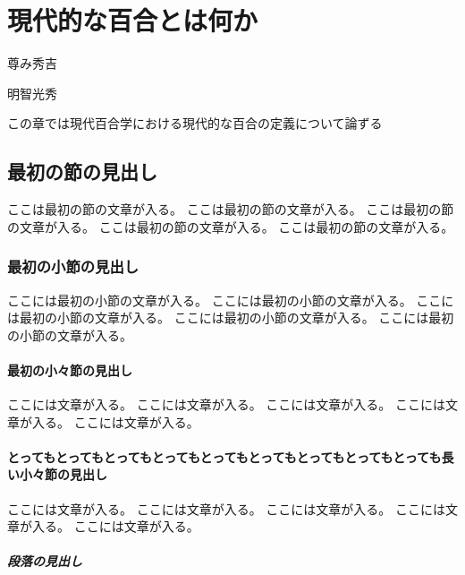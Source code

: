\documentclass[ %
	uplatex,%
	a5paper,%
	papersize%
	]{jsbook}
\begin{document}
						\tableofcontents %

						\mainmatter

						\chapter{現代的な百合とは何か}

						\epigraph{尊み秀吉}{明智光秀}

						\begin{summary}
							この章では現代百合学における現代的な百合の定義について論ずる
						\end{summary}

						\section{最初の節の見出し}

						ここは最初の節の文章が入る。
						ここは最初の節の文章が入る。
						ここは最初の節の文章が入る。
						ここは最初の節の文章が入る。
						ここは最初の節の文章が入る。

						\subsection{最初の小節の見出し}

						ここには最初の小節の文章が入る。
						ここには最初の小節の文章が入る。
						ここには最初の小節の文章が入る。
						ここには最初の小節の文章が入る。
						ここには最初の小節の文章が入る。

						\subsubsection{最初の小々節の見出し}

						ここには文章が入る。
						ここには文章が入る。
						ここには文章が入る。
						ここには文章が入る。
						ここには文章が入る。

						\subsubsection{とってもとってもとってもとってもとってもとってもとってもとってもとっても長い小々節の見出し}

						ここには文章が入る。
						ここには文章が入る。
						ここには文章が入る。
						ここには文章が入る。
						ここには文章が入る。

						\paragraph{段落の見出し}
\end{document}
